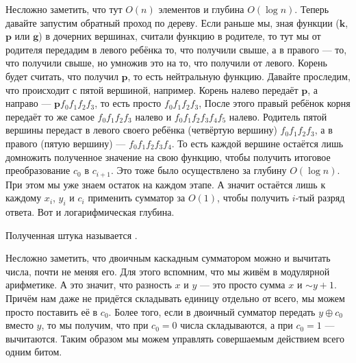 \documentclass{article}
\begin{document}
\begin{itemize}
\begin{Example}
\begin{center}
            \end{center}
            Несложно заметить, что тут $O(n)$ элементов и глубина $O(\log n)$. Теперь давайте запустим обратный проход по дереву. Если раньше мы, зная функции ($\mathbf k$, $\mathbf p$ или $\mathbf g$) в дочерних вершинах, считали функцию в родителе, то тут мы от родителя передадим в левого ребёнка то, что получили свыше, а в правого --- то, что получили свыше, но умножив это на то, что получили от левого. Корень будет считать, что получил $\mathbf p$, то есть нейтральную функцию. Давайте проследим, что происходит с пятой вершиной, например. Корень налево передаёт $\mathbf p$, а направо --- $\mathbf p f_0f_1f_2f_3$, то есть просто $f_0f_1f_2f_3$,  После этого правый ребёнок корня передаёт то же самое $f_0f_1f_2f_3$ налево и $f_0f_1f_2f_3f_4f_5$ налево. Родитель пятой вершины передаст в левого своего ребёнка (четвёртую вершину) $f_0f_1f_2f_3$, а в правого (пятую вершину) --- $f_0f_1f_2f_3f_4$. То есть каждой вершине остаётся лишь домножить полученное значение на свою функцию, чтобы получить итоговое преобразование $c_0$ в $c_{i+1}$. Это тоже было осуществлено за глубину $O(\log n)$. При этом мы уже знаем остаток на каждом этапе. А значит остаётся лишь к каждому $x_i$, $y_i$ и $c_i$ применить сумматор за $O(1)$, чтобы получить $i$-тый разряд ответа. Вот и логарифмическая глубина.
        \end{Example}
        \dfn Полученная штука называется .
        \begin{Comment}
            Несложно заметить, что двоичным каскадным сумматором можно и вычитать числа, почти не меняя его. Для этого вспомним, что мы живём в модулярной арифметике. А это значит, что разность $x$ и $y$ --- это просто сумма $x$ и ${\sim}y+1$. Причём нам даже не придётся складывать единицу отдельно от всего, мы можем просто поставить её в $c_0$. Более того, если в двоичный сумматор передать $y\oplus c_0$ вместо $y$, то мы получим, что при $c_0=0$ числа складываются, а при $c_0=1$ --- вычитаются. Таким образом мы можем управлять совершаемым действием всего одним битом.

\end{Comment}
\end{itemize}
\end{document}
